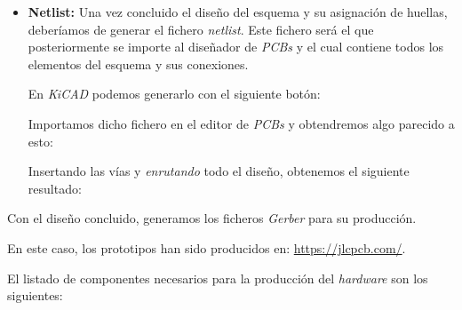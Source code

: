 \begin{itemize}
\item
\textbf{Netlist:} Una vez concluido el diseño del esquema y su asignación de huellas, deberíamos de generar el fichero \emph{netlist}. Este fichero será el que posteriormente se importe al diseñador de \emph{PCBs} y el cual contiene todos los elementos del esquema y sus conexiones.

En \emph{KiCAD} podemos generarlo con el siguiente botón:


Importamos dicho fichero en el editor de \emph{PCBs} y obtendremos algo parecido a esto:


Insertando las vías y \emph{enrutando} todo el diseño, obtenemos el siguiente resultado:


\end{itemize}

Con el diseño concluido, generamos los ficheros \emph{Gerber} para su producción.

En este caso, los prototipos han sido producidos en:
\url{https://jlcpcb.com/}.

El listado de componentes necesarios para la producción del \emph{hardware} son los siguientes:


